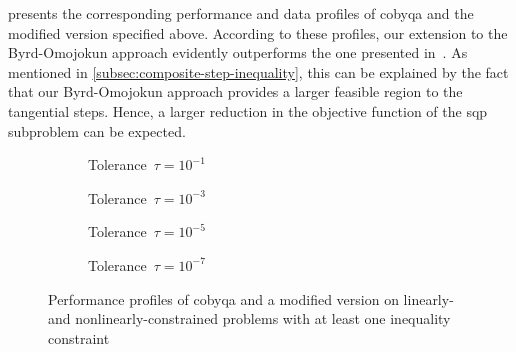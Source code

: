  presents the corresponding performance and data profiles of \gls{cobyqa} and the modified version specified above.
According to these profiles, our extension to the Byrd-Omojokun approach evidently outperforms the one presented in~\cite[\S~15.4.4]{Conn_Gould_Toint_2000}.
As mentioned in \cref{subsec:composite-step-inequality}, this can be explained by the fact that our Byrd-Omojokun approach provides a larger feasible region to the tangential steps.
Hence, a larger reduction in the objective function of the \gls{sqp} subproblem can be expected.

\begin{figure}[ht]
    \centering
    \begin{subfigure}[b]{0.49\textwidth}
        \centering
        \caption{Tolerance~$\tau = 10^{-1}$}
    \end{subfigure}
    \hfill
    \begin{subfigure}[b]{0.49\textwidth}
        \centering
        \caption{Tolerance~$\tau = 10^{-3}$}
    \end{subfigure}
    \begin{subfigure}[b]{0.49\textwidth}
        \centering
        \caption{Tolerance~$\tau = 10^{-5}$}
    \end{subfigure}
    \hfill
    \begin{subfigure}[b]{0.49\textwidth}
        \centering
        \caption{Tolerance~$\tau = 10^{-7}$}
    \end{subfigure}
    \caption{Performance profiles of \gls{cobyqa} and a modified version on linearly- and nonlinearly-constrained problems with at least one inequality constraint}
    \label{fig:perf-byrd-omojokun}
\end{figure}

